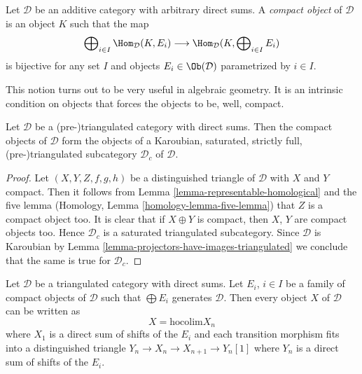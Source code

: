 \begin{definition}
\label{definition-compact-object}
Let $\mathcal{D}$ be an additive category with arbitrary direct
sums. A {\it compact object} of $\mathcal{D}$ is an object $K$
such that the map
$$
\bigoplus\nolimits_{i \in I} \Hom_{\mathcal{D}}(K, E_i)
\longrightarrow
\Hom_{\mathcal{D}}(K, \bigoplus\nolimits_{i \in I} E_i)
$$
is bijective for any set $I$ and objects
$E_i \in \Ob(\mathcal{D})$ parametrized by $i \in I$.
\end{definition}

\noindent
This notion turns out to be very useful in algebraic geometry.
It is an intrinsic condition on objects that forces the objects
to be, well, compact.

\begin{lemma}
\label{lemma-compact-objects-subcategory}
Let $\mathcal{D}$ be a (pre-)triangulated category with direct sums.
Then the compact objects of $\mathcal{D}$ form the objects of a
Karoubian, saturated, strictly full, (pre-)triangulated subcategory
$\mathcal{D}_c$ of $\mathcal{D}$.
\end{lemma}

\begin{proof}
Let $(X, Y, Z, f, g, h)$ be a distinguished triangle of $\mathcal{D}$
with $X$ and $Y$ compact. Then it follows from
Lemma \ref{lemma-representable-homological}
and the five lemma
(Homology, Lemma \ref{homology-lemma-five-lemma})
that $Z$ is a compact object too. It is clear that if $X \oplus Y$
is compact, then $X$, $Y$ are compact objects too. Hence
$\mathcal{D}_c$ is a saturated triangulated subcategory.
Since $\mathcal{D}$ is Karoubian by
Lemma \ref{lemma-projectors-have-images-triangulated}
we conclude that the same is true for $\mathcal{D}_c$.
\end{proof}

\begin{lemma}
\label{lemma-write-as-colimit}
Let $\mathcal{D}$ be a triangulated category with direct sums.
Let $E_i$, $i \in I$ be a family of compact objects of $\mathcal{D}$
such that $\bigoplus E_i$ generates $\mathcal{D}$.
Then every object $X$ of $\mathcal{D}$ can be written as
$$
X = \text{hocolim} X_n
$$
where $X_1$ is a direct sum of shifts of the $E_i$ and each transition
morphism fits into a distinguished triangle
$Y_n \to X_n \to X_{n + 1} \to Y_n[1]$
where $Y_n$ is a direct sum of shifts of the $E_i$.
\end{lemma}

